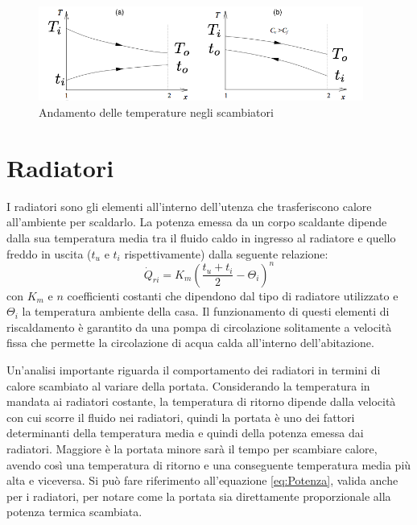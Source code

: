 \documentclass[laurea,oneside,11pt]{USiena_tesiLM}
\begin{document}
\begin{figure}[h]
\begin{center}
\includegraphics[width=0.95\textwidth]{figure/grafico_scambiatore} %
\caption{Andamento delle temperature negli scambiatori }
\label{fig:andamento}
\end{center}
\end{figure}

\section{Radiatori}
\label{subsec:radiatori}
I radiatori sono gli elementi all'interno dell'utenza che trasferiscono calore all'ambiente per scaldarlo. 
La potenza emessa da un corpo scaldante dipende dalla sua temperatura media tra il fluido caldo in ingresso al radiatore e quello freddo in uscita ($t_u$ e $t_i$ rispettivamente) dalla seguente relazione:
\begin{equation}
\dot{Q}_{ri}= K_m(\frac{t_u + t_i}{2} - \Theta_{i})^n
\label{eq:potenza_radiatori}
\end{equation}
con $K_m$ e $n$ coefficienti costanti che dipendono dal tipo di radiatore utilizzato e $\Theta_i$ la temperatura ambiente della casa. 
Il funzionamento di questi elementi di riscaldamento è garantito da una pompa di circolazione solitamente a velocità fissa che permette la circolazione di acqua calda all'interno dell'abitazione. 

Un'analisi importante riguarda il comportamento dei radiatori in termini di calore scambiato al variare della portata. Considerando la temperatura in mandata ai radiatori costante, la temperatura di ritorno dipende  dalla velocità con cui scorre il fluido nei radiatori, quindi la portata è uno dei fattori determinanti della temperatura media e quindi della potenza emessa dai radiatori. Maggiore è la portata minore sarà il tempo per scambiare calore, avendo così una temperatura di ritorno e una conseguente temperatura media più alta e viceversa. Si può fare riferimento all'equazione \ref{eq:Potenza}, valida anche per i radiatori, per notare come la portata sia direttamente proporzionale alla potenza termica scambiata. 
\end{document}
